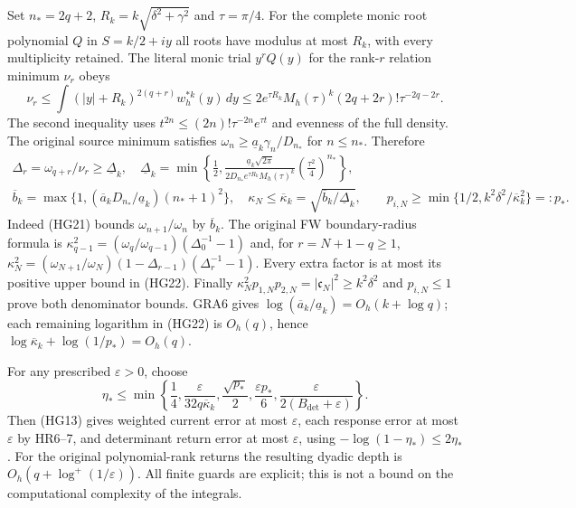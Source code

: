 Set $n_*=2q+2$, $R_k=k\sqrt{\delta^2+\gamma^2}$ and $\tau=\pi/4$.
For the complete monic root polynomial $Q$ in $S=k/2+iy$ all roots
have modulus at most $R_k$, with every multiplicity retained.
The literal monic trial $y^rQ(y)$ for the rank-$r$ relation minimum
$\nu_r$ obeys
\[
\nu_r\le\int(|y|+R_k)^{2(q+r)}w_h^{*k}(y)\,dy
 \le2e^{\tau R_k}M_h(\tau)^k(2q+2r)!\tau^{-2q-2r}.
\]
The second inequality uses $t^{2n}\le(2n)!\tau^{-2n}e^{\tau t}$
and evenness of the full density. The original source minimum
satisfies $\omega_n\ge\underline a_k\gamma_n/D_{n_*}$ for
$n\le n_*$. Therefore
\[
\begin{gathered}
\Delta_r=\omega_{q+r}/\nu_r\ge\underline\Delta_k,
\quad\underline\Delta_k=
\min\left\{\frac12,
\frac{\underline a_k\sqrt{2\pi}}
{2D_{n_*}e^{\tau R_k}M_h(\tau)^k}
\left(\frac{\tau^2}{4}\right)^{n_*}\right\},\\
\overline b_k=\max\{1,
(\overline a_kD_{n_*}/\underline a_k)(n_*+1)^2\},\quad
\kappa_N\le\overline\kappa_k=
\sqrt{\overline b_k/\underline\Delta_k},\qquad
p_{i,N}\ge\min\{1/2,k^2\delta^2/\overline\kappa_k^2\}=:p_*.
\end{gathered}\tag{HG22}
\]
Indeed (HG21) bounds $\omega_{n+1}/\omega_n$ by
$\overline b_k$. The original FW boundary-radius formula is
$\kappa_{q-1}^2=(\omega_q/\omega_{q-1})(\Delta_0^{-1}-1)$ and,
for $r=N+1-q\ge1$,
$\kappa_N^2=(\omega_{N+1}/\omega_N)(1-\Delta_{r-1})(\Delta_r^{-1}-1)$.
Every extra factor is at most its positive upper bound in (HG22).
Finally $\kappa_N^2p_{1,N}p_{2,N}=|\mathfrak c_N|^2\ge k^2\delta^2$
and $p_{i,N}\le1$ prove both denominator bounds.
GRA6 gives $\log(\overline a_k/\underline a_k)=O_h(k+\log q)$;
each remaining logarithm in (HG22) is $O_h(q)$, hence
$\log\overline\kappa_k+\log(1/p_*)=O_h(q)$.

For any prescribed $\varepsilon>0$, choose
\[
\eta_*\le\min\left\{\frac14,\frac{\varepsilon}{32q\overline\kappa_k},
\frac{\sqrt{p_*}}2,\frac{\varepsilon p_*}{6},
\frac{\varepsilon}{2(B_{\det}+\varepsilon)}\right\} .\tag{HG23}
\]
Then (HG13) gives weighted current error at most $\varepsilon$,
each response error at most $\varepsilon$ by HR6--7, and determinant
return error at most $\varepsilon$, using
$-\log(1-\eta_*)\le2\eta_*$.
For the original polynomial-rank returns the resulting dyadic depth
is $O_h(q+\log^+(1/\varepsilon))$. All finite guards are explicit;
this is not a bound on the computational complexity of the integrals.

